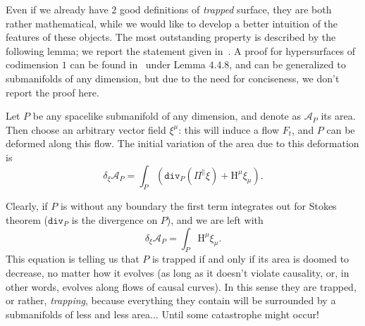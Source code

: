 Even if we already have \(2\) good definitions of \emph{trapped} surface, they are both rather mathematical, while we would like to develop a better intuition of the features of these objects. The most outstanding property is described by the following lemma; we report the statement given in~\cite{senovilla2022critical}. A proof for hypersurfaces of codimension \(1\) can be found in~\cite{kriele1999spacetime} under Lemma \(4.4.8\), and can be generalized to submanifolds of any dimension, but due to the need for conciseness, we don't report the proof here.
\begin{lemma}
	\label{lemma:variation-area}
	Let \(P\) be any spacelike submanifold of any dimension, and denote as \(\mathcal{A}_P\) its area. Then choose an arbitrary vector field \(\xi^{\mu}\): this will induce a flow \(F_t\), and \(P\) can be deformed along this flow. The initial variation of the area due to this deformation is
	\[
	\delta_{\xi}\mathcal{A}_P = \int_{P} \left(\texttt{div}_P (\Pi^{\parallel}\xi) + \mathrm{H}^{\mu}\xi_{\mu}\right).
	\]
\end{lemma}
 Clearly, if \(P\) is without any boundary the first term integrates out for Stokes theorem (\(\texttt{div}_P\) is the divergence on \(P\)), and we are left with
 \begin{equation}
 	\label{eq:variation-area}
 	\delta_{\xi}\mathcal{A}_P = \int_{P} \mathrm{H}^{\mu}\xi_{\mu}.
 \end{equation}
	This equation is telling us that \(P\) is trapped if and only if its area is doomed to decrease, no matter how it evolves (as long as it doesn't violate causality, or, in other words, evolves along flows of causal curves). In this sense they are trapped, or rather, \emph{trapping}, because everything they contain will be surrounded by a submanifolds of less and less area... Until some catastrophe might occur!

